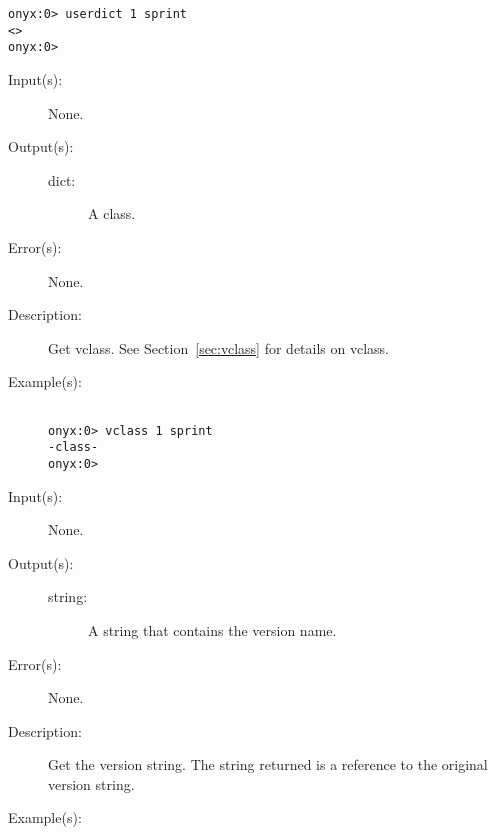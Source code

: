 \begin{description}
\begin{description}
\begin{verbatim}
onyx:0> userdict 1 sprint
<>
onyx:0>
		\end{verbatim}
	\end{description}
\label{systemdict:vclass}
\item[{\onyxop{--}{vclass}{class}}: ]
	\begin{description}\item[]
	\item[Input(s): ] None.
	\item[Output(s): ]
		\begin{description}\item[]
		\item[dict: ]
			A class.
		\end{description}
	\item[Error(s): ] None.
	\item[Description: ]
		Get vclass.  See Section~\ref{sec:vclass} for details on vclass.
	\item[Example(s): ]\begin{verbatim}

onyx:0> vclass 1 sprint
-class-
onyx:0>
		\end{verbatim}
	\end{description}
\label{systemdict:version}
\item[{\onyxop{--}{version}{string}}: ]
	\begin{description}\item[]
	\item[Input(s): ] None.
	\item[Output(s): ]
		\begin{description}\item[]
		\item[string: ]
			A string that contains the version name.
		\end{description}
	\item[Error(s): ] None.
	\item[Description: ]
		Get the version string.  The string returned is a reference to
		the original version string.
	\item[Example(s): ]\begin{verbatim}


\end{verbatim}
\end{description}
\end{description}
